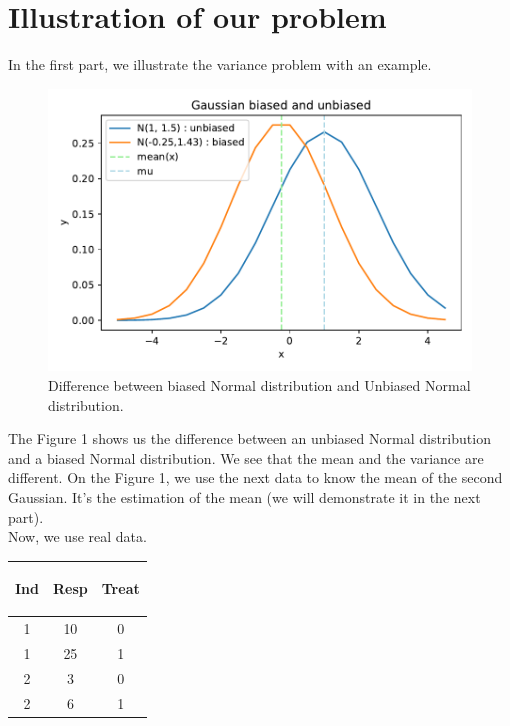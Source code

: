 \documentclass{article}
\begin{document}
\section{Illustration of our problem}
In the first part, we illustrate the variance problem with an example. 
\begin{figure}[H]
    \begin{center}
    \includegraphics[scale=0.7]{./images/Biased_normal_distri.pdf}
    \caption{Difference between biased Normal distribution and Unbiased Normal distribution.}
    \end{center}
\end{figure}
The Figure 1 shows us the difference between an unbiased Normal distribution and a biased Normal distribution. We see that the mean and the variance are different. On the Figure 1, we use the next data to know the mean of the second Gaussian. It's the estimation of the mean (we will demonstrate it in the next part).\\
Now, we use real data.\\
\begin{table}[h!]
        \centering
        \begin{tabular}{| c | c | c|}
        \hline
        \begin{bf} Ind \end{bf} &
        \begin{bf} Resp \end{bf} &
        \begin{bf} Treat \end{bf} \\
        \hline
        1 &  10 & 0\\
        1 & 25 & 1 \\
        2 & 3 & 0 \\
        2 &  6 & 1\\
        \hline
        \end{tabular}
\end{table}
\end{document}
